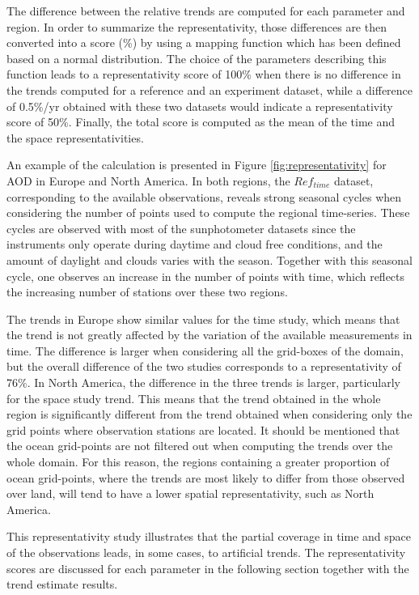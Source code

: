 \documentclass[acp, manuscript]{copernicus}
\begin{document}
The difference between the relative trends are computed for each parameter and region. In order to summarize the representativity, those differences are then converted into a score (\unit{\%}) by using a mapping function which has been defined based on a normal distribution. The choice of the parameters describing this function leads to a representativity score of 100\% when there is no difference in the trends computed for a reference and an experiment dataset, while a difference of 0.5\unit{\%/yr} obtained with these two datasets would indicate a representativity score of 50\%. Finally, the total score is computed as the mean of the time and the space representativities. 

An example of the calculation is presented in Figure \ref{fig:representativity} for AOD in Europe and North America. In both regions, the $Ref_{time}$ dataset, corresponding to the available observations, reveals strong seasonal cycles when considering the number of points used to compute the regional time-series. These cycles are observed with most of the sunphotometer datasets since the instruments only operate during daytime and cloud free conditions, and the amount of daylight and clouds varies with the season. Together with this seasonal cycle, one observes an increase in the number of points with time, which reflects the increasing number of stations over these two regions. 

The trends in Europe show similar values for the time study, which means that the trend is not greatly affected by the variation of the available measurements in time. The difference is larger when considering all the grid-boxes of the domain, but the overall difference of the two studies corresponds to a representativity of 76\%. In North America, the difference in the three trends is larger, particularly for the space study trend. This means that the trend obtained in the whole region is significantly different from the trend obtained when considering only the grid points where observation stations are located. It should be mentioned that the ocean grid-points are not filtered out when computing the trends over the whole domain. For this reason, the regions containing a greater proportion of ocean grid-points, where the trends are most likely to differ from those observed over land, will tend to have a lower spatial representativity, such as North America.

This representativity study illustrates that the partial coverage in time and space of the observations leads, in some cases, to artificial trends. The representativity scores are discussed for each parameter in the following section together with the trend estimate results.
\end{document}
